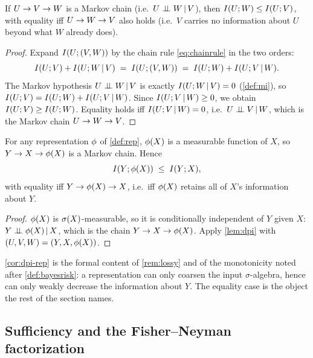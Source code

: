 \begin{lemma}
\label{lem:dpi}
If $U \rightarrow V \rightarrow W$ is a Markov chain (i.e.\ $U \perp\!\!\!\perp W \,\vert\, V$),
then $I(U ; W) \le I(U ; V)$, with equality iff $U \rightarrow W \rightarrow V$ also
holds (i.e.\ $V$ carries no information about $U$ beyond what $W$ already does).
\end{lemma}

\begin{proof}
Expand $I(U ; (V,W))$ by the chain rule \eqref{eq:chainrule} in the two
orders:
\[
  I(U ; V) + I(U ; W \,\vert\, V)
  \;=\; I(U ; (V,W)) \;=\;
  I(U ; W) + I(U ; V \,\vert\, W).
\]
The Markov hypothesis $U \perp\!\!\!\perp W \,\vert\, V$ is exactly $I(U ; W\,\vert\, V)=0$
(\cref{def:mi}), so $I(U ; V) = I(U ; W) + I(U ; V \,\vert\, W)$. Since
$I(U ; V\,\vert\, W)\ge 0$, we obtain $I(U ; V) \ge I(U ; W)$. Equality holds
iff $I(U ; V\,\vert\, W)=0$, i.e.\ $U \perp\!\!\!\perp V \,\vert\, W$, which is the Markov
chain $U \rightarrow W \rightarrow V$.
\end{proof}

\begin{corollary}
\label{cor:dpi-rep}
For any representation $\phi$ of \cref{def:rep}, $\phi(X)$ is a measurable
function of $X$, so $Y \rightarrow X \rightarrow \phi(X)$ is a Markov chain. Hence
\begin{equation}
  \label{eq:dpi-rep}
  I(Y ; \phi(X)) \;\le\; I(Y ; X),
\end{equation}
with equality iff $Y \rightarrow \phi(X) \rightarrow X$, i.e.\ iff $\phi(X)$ retains
all of $X$'s information about $Y$.
\end{corollary}

\begin{proof}
$\phi(X)$ is $\sigma\!\left(X\right)$-measurable, so it is conditionally independent of
$Y$ given $X$: $Y \perp\!\!\!\perp \phi(X) \,\vert\, X$, which is the chain
$Y \rightarrow X \rightarrow \phi(X)$. Apply \cref{lem:dpi} with
$(U,V,W)=(Y,X,\phi(X))$.
\end{proof}

\cref{cor:dpi-rep} is the formal content of \cref{rem:lossy} and of the
monotonicity noted after \cref{def:bayesrisk}: a representation can only
coarsen the input $\sigma$-algebra, hence can only weakly decrease the
information about $Y$. The equality case is the object the rest of the section
names.

\subsection{Sufficiency and the Fisher--Neyman factorization}
\label{subsec:sufficiency}

